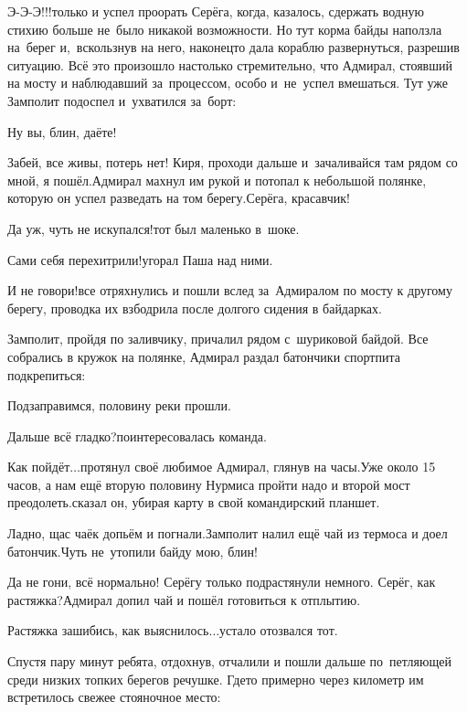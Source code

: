 \diagdash Э-Э-Э!!!\mdash только и успел проорать Серёга, когда, казалось, сдержать водную стихию больше не~было никакой возможности. Но тут корма байды наползла на~берег и,~вскользнув на него, наконец\sdash то дала кораблю развернуться, разрешив ситуацию. Всё это произошло настолько стремительно, что Адмирал, стоявший на мосту и наблюдавший за~процессом, особо и~не~успел вмешаться. Тут уже Замполит подоспел и~ухватился за~борт:

\diagdash Ну вы, блин, даёте!

\diagdash Забей, все живы, потерь нет! Киря, проходи дальше и~зачаливайся там рядом со мной, я пошёл.\mdash Адмирал махнул им рукой и потопал к небольшой полянке, которую он успел разведать на том берегу.\mdash Серёга, красавчик!

\diagdash Да уж, чуть не искупался!\mdash тот был маленько в~шоке.

\diagdash Сами себя перехитрили!\mdash угорал Паша над ними.

\diagdash И не говори!\mdash все отряхнулись и пошли вслед за~Адмиралом по мосту к другому берегу, проводка их взбодрила после долгого сидения в байдарках.

Замполит, пройдя по заливчику, причалил рядом с~шуриковой байдой. Все собрались в кружок на полянке, Адмирал раздал батончики спортпита подкрепиться:

\diagdash Подзаправимся, половину реки прошли.

\diagdash Дальше всё гладко?\mdash поинтересовалась команда.

\renewcommand*{\thefootnote}{\fnsymbol{footnote}}
\setcounter{footnote}{0}
\diagdash Как пойдёт$\ldots$\mdash протянул своё любимое Адмирал, глянув на часы.\mdash Уже около 15 часов, а нам ещё вторую половину Нурмиса пройти надо и второй мост преодолеть.\mdash сказал он, убирая карту в свой командирский планшет.

\diagdash Ладно, щас чаёк допьём и погнали.\mdash Замполит налил ещё чай из термоса и доел батончик.\mdash Чуть не~утопили байду мою, блин!

\diagdash Да не гони, всё нормально! Серёгу только подрастянули немного. Серёг, как растяжка?\mdash Адмирал допил чай и пошёл готовиться к отплытию.

\diagdash Растяжка зашибись, как выяснилось$\ldots$\mdash устало отозвался тот.

Спустя пару минут ребята, отдохнув, отчалили и пошли дальше по~петляющей среди низких топких берегов речушке. Где\sdash то примерно через километр им встретилось свежее стояночное место:

